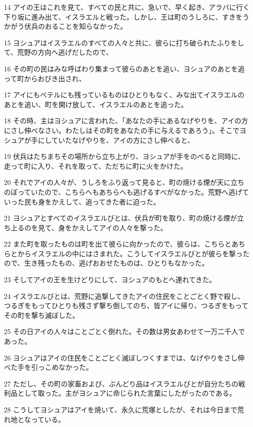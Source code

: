 \par 14 アイの王はこれを見て、すべての民と共に、急いで、早く起き、アラバに行く下り坂に進み出て、イスラエルと戦った。しかし、王は町のうしろに、すきをうかがう伏兵のおることを知らなかった。
\par 15 ヨシュアはイスラエルのすべての人々と共に、彼らに打ち破られたふりをして、荒野の方向へ逃げだしたので、
\par 16 その町の民はみな呼ばわり集まって彼らのあとを追い、ヨシュアのあとを追って町からおびき出され、
\par 17 アイにもベテルにも残っているものはひとりもなく、みな出てイスラエルのあとを追い、町を開け放して、イスラエルのあとを追った。
\par 18 その時、主はヨシュアに言われた、「あなたの手にあるなげやりを、アイの方にさし伸べなさい。わたしはその町をあなたの手に与えるであろう」。そこでヨシュアが手にしていたなげやりを、アイの方にさし伸べると、
\par 19 伏兵はたちまちその場所から立ち上がり、ヨシュアが手をのべると同時に、走って町に入り、それを取って、ただちに町に火をかけた。
\par 20 それでアイの人々が、うしろをふり返って見ると、町の焼ける煙が天に立ちのぼっていたので、こちらへもあちらへも逃げるすべがなかった。荒野へ逃げていった民も身をかえして、追ってきた者に迫った。
\par 21 ヨシュアとすべてのイスラエルびとは、伏兵が町を取り、町の焼ける煙が立ち上るのを見て、身をかえしてアイの人々を撃った。
\par 22 また町を取ったものは町を出て彼らに向かったので、彼らは、こちらとあちらとからイスラエルの中にはさまれた。こうしてイスラエルびとが彼らを撃ったので、生き残ったもの、逃げおおせたものは、ひとりもなかった。
\par 23 そしてアイの王を生けどりにして、ヨシュアのもとへ連れてきた。
\par 24 イスラエルびとは、荒野に追撃してきたアイの住民をことごとく野で殺し、つるぎをもってひとりも残さず撃ち倒してのち、皆アイに帰り、つるぎをもってその町を撃ち滅ぼした。
\par 25 その日アイの人々はことごとく倒れた。その数は男女あわせて一万二千人であった。
\par 26 ヨシュアはアイの住民をことごとく滅ぼしつくすまでは、なげやりをさし伸べた手を引っこめなかった。
\par 27 ただし、その町の家畜および、ぶんどり品はイスラエルびとが自分たちの戦利品として取った。主がヨシュアに命じられた言葉にしたがったのである。
\par 28 こうしてヨシュアはアイを焼いて、永久に荒塚としたが、それは今日まで荒れ地となっている。
